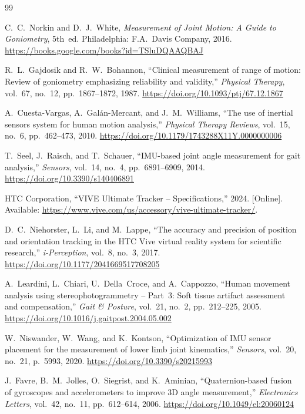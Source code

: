 \documentclass[11pt,a4paper]{article}
\begin{document}
\begin{thebibliography}{99}

C.~C.~Norkin and D.~J.~White, \textit{Measurement of Joint Motion: A Guide
to Goniometry}, 5th~ed. Philadelphia: F.A.~Davis Company, 2016.
\url{https://books.google.com/books?id=TSluDQAAQBAJ}

R.~L.~Gajdosik and R.~W.~Bohannon, ``Clinical measurement of range of
motion: Review of goniometry emphasizing reliability and validity,''
\textit{Physical Therapy}, vol.~67, no.~12, pp.~1867--1872, 1987.
\url{https://doi.org/10.1093/ptj/67.12.1867}

A.~Cuesta-Vargas, A.~Gal\'an-Mercant, and J.~M.~Williams, ``The use of
inertial sensors system for human motion analysis,''
\textit{Physical Therapy Reviews}, vol.~15, no.~6, pp.~462--473, 2010.
\url{https://doi.org/10.1179/1743288X11Y.0000000006}

T.~Seel, J.~Raisch, and T.~Schauer, ``IMU-based joint angle measurement
for gait analysis,'' \textit{Sensors}, vol.~14, no.~4, pp.~6891--6909,
2014.
\url{https://doi.org/10.3390/s140406891}

HTC Corporation, ``VIVE Ultimate Tracker -- Specifications,'' 2024.
[Online]. Available:
\url{https://www.vive.com/us/accessory/vive-ultimate-tracker/}.

D.~C.~Niehorster, L.~Li, and M.~Lappe, ``The accuracy and precision of
position and orientation tracking in the HTC Vive virtual reality system
for scientific research,'' \textit{i-Perception}, vol.~8, no.~3, 2017.
\url{https://doi.org/10.1177/2041669517708205}

A.~Leardini, L.~Chiari, U.~Della~Croce, and A.~Cappozzo, ``Human
movement analysis using stereophotogrammetry -- Part~3: Soft tissue
artifact assessment and compensation,'' \textit{Gait \& Posture}, vol.~21,
no.~2, pp.~212--225, 2005.
\url{https://doi.org/10.1016/j.gaitpost.2004.05.002}

W.~Niswander, W.~Wang, and K.~Kontson, ``Optimization of IMU sensor
placement for the measurement of lower limb joint kinematics,''
\textit{Sensors}, vol.~20, no.~21, p.~5993, 2020.
\url{https://doi.org/10.3390/s20215993}

J.~Favre, B.~M.~Jolles, O.~Siegrist, and K.~Aminian, ``Quaternion-based
fusion of gyroscopes and accelerometers to improve 3D angle
measurement,'' \textit{Electronics Letters}, vol.~42, no.~11,
pp.~612--614, 2006.
\url{https://doi.org/10.1049/el:20060124}


\end{thebibliography}
\end{document}
